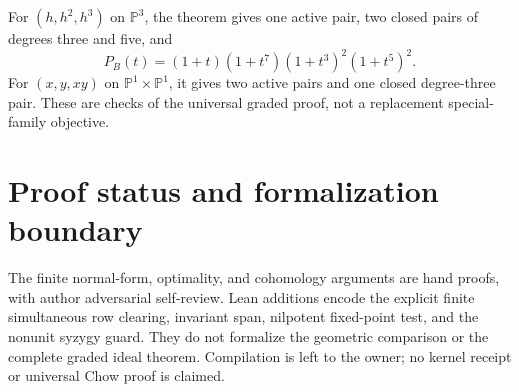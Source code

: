 \documentclass[11pt]{article}
\begin{document}
For $(h,h^2,h^3)$ on $\mathbb P^3$, the theorem gives one active pair,
two closed pairs of degrees three and five, and
\[
 P_B(t)=(1+t)(1+t^7)(1+t^3)^2(1+t^5)^2.
\]
For $(x,y,xy)$ on $\mathbb P^1\times\mathbb P^1$, it gives two active
pairs and one closed degree-three pair. These are checks of the universal
graded proof, not a replacement special-family objective.

\section{Proof status and formalization boundary}
The finite normal-form, optimality, and cohomology arguments are hand
proofs, with author adversarial self-review. Lean additions encode the
explicit finite simultaneous row clearing, invariant span, nilpotent
fixed-point test, and the nonunit syzygy guard. They do not formalize the
geometric comparison or the complete graded ideal theorem. Compilation
is left to the owner; no kernel receipt or universal Chow proof is claimed.
\end{document}
